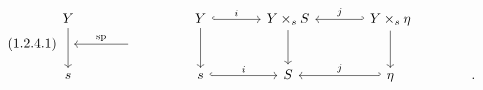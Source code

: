 \begin{equation}\tag{1.2.4.1}
\begin{tikzcd}[column sep=large, row sep=small]
Y \arrow[dd] & {} & Y \arrow[r, hook, "i"] \arrow[dd] & Y \times_s S \arrow[dd] & Y \times_s \eta \arrow[l, hook', "j"'] \arrow[dd] & {} \\
{} & {} \arrow[l, "\mathrm{sp}"'] & {} & {} & {} & {} \\
s & {} & s \arrow[r, hook, "i"] & S & \eta \arrow[l, hook', "j"'] & {.}
\end{tikzcd}
\end{equation}
